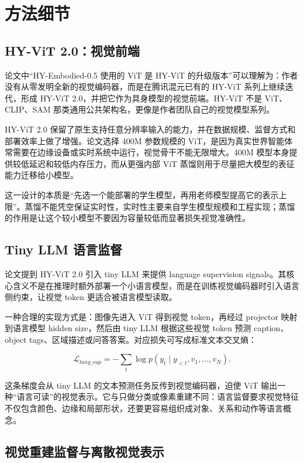 \section{方法细节}

\subsection{HY-ViT 2.0：视觉前端}

论文中“HY-Embodied-0.5 使用的 ViT 是 HY-ViT 的升级版本”可以理解为：作者没有从零发明全新的视觉编码器，而是在腾讯混元已有的 HY-ViT 系列上继续迭代，形成 HY-ViT 2.0，并把它作为具身模型的视觉前端。HY-ViT 不是 ViT、CLIP、SAM 那类通用公共架构名，更像是作者团队自己的视觉模型系列。

HY-ViT 2.0 保留了原生支持任意分辨率输入的能力，并在数据规模、监督方式和部署效率上做了增强。论文选择 400M 参数规模的 ViT，是因为真实世界智能体常需要在边缘设备或实时系统中运行，视觉骨干不能无限增大。400M 模型本身提供较低延迟和较低内存压力，而从更强内部 ViT 蒸馏则用于尽量把大模型的表征能力迁移给小模型。

这一设计的本质是“先选一个能部署的学生模型，再用老师模型提高它的表示上限”。蒸馏不能凭空保证实时性，实时性主要来自学生模型规模和工程实现；蒸馏的作用是让这个较小模型不要因为容量较低而显著损失视觉准确性。

\subsection{Tiny LLM 语言监督}

论文提到 HY-ViT 2.0 引入 tiny LLM 来提供 language supervision signals。其核心含义不是在推理时额外部署一个小语言模型，而是在训练视觉编码器时引入语言侧约束，让视觉 token 更适合被语言模型读取。

一种合理的实现方式是：图像先进入 ViT 得到视觉 token，再经过 projector 映射到语言模型 hidden size，然后由 tiny LLM 根据这些视觉 token 预测 caption、object tags、区域描述或问答答案。对应损失可写成标准文本交叉熵：

\begin{equation}
    \mathcal{L}_{lang\_sup}
    = - \sum_t \log p(y_t \mid y_{<t}, v_1,\dots,v_N).
\end{equation}

这条梯度会从 tiny LLM 的文本预测任务反传到视觉编码器，迫使 ViT 输出一种“语言可读”的视觉表示。它与只做分类或像素重建不同：语言监督要求视觉特征不仅包含颜色、边缘和局部形状，还要更容易组织成对象、关系和动作等语言概念。

\subsection{视觉重建监督与离散视觉表示}

